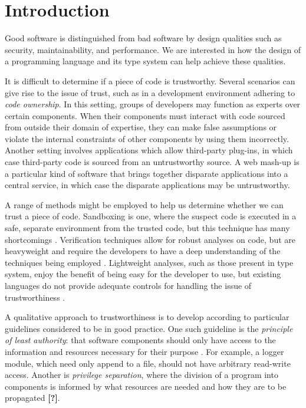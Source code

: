 \chapter{Introduction}\label{C:intro}

Good software is distinguished from bad software by design qualities such as security, maintainability, and performance. We are interested in how the design of a programming language and its type system can help achieve these qualities.

It is difficult to determine if a piece of code is trustworthy. Several scenarios can give rise to the issue of trust, such as in a development environment adhering to \textit{code ownership}. In this setting, groups of developers may function as experts over certain components. When their components must interact with code sourced from outside their domain of expertise, they can make false assumptions or violate the internal constraints of other components by using them incorrectly. Another setting involves applications which allow third-party plug-ins, in which case third-party code is sourced from an untrustworthy source. A web mash-up is a particular kind of software that brings together disparate applications into a central service, in which case the disparate applications may be untrustworthy.

A range of methods might be employed to help us determine whether we can trust a piece of code. Sandboxing is one, where the suspect code is executed in a safe, separate environment from the trusted code, but this technique has many shortcomings \cite{Jonathan's papers}. Verification techniques allow for robust analyses on code, but are heavyweight and require the developers to have a deep understanding of the techniques being employed \cite{citation needed?}. Lightweight analyses, such as those present in type system, enjoy the benefit of being easy for the developer to use, but existing languages do not provide adequate controls for handling the issue of trustworthiness \cite{see citations in Darya's modules paper}.

A qualitative approach to trustworthiness is to develop according to particular guidelines considered to be in good practice. One such guideline is the \textit{principle of least authority}: that software components should only have access to the information and resources necessary for their purpose \cite{saltzer74}. For example, a logger module, which need only append to a file, should not have arbitrary read-write access. Another is \textit{privilege separation}, where the division of a program into components is informed by what resources are needed and how they are to be propagated \textbf{[?]}.

